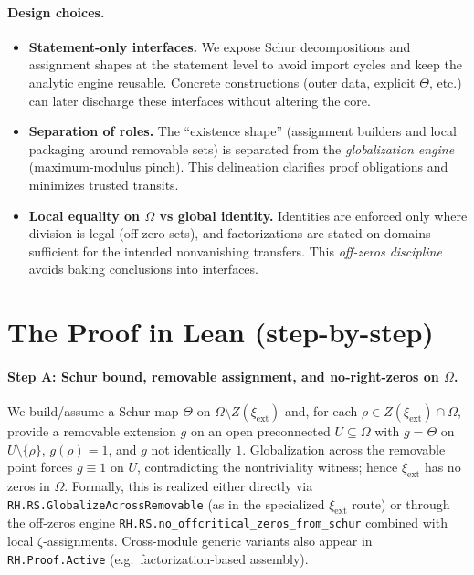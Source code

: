 \documentclass[11pt]{article}
\theoremstyle{plain}
\theoremstyle{definition}
\begin{document}
\paragraph{Design choices.}
\begin{itemize}
  \item \textbf{Statement-only interfaces.} We expose Schur decompositions and assignment shapes at the statement level to avoid import cycles and keep the analytic engine reusable. Concrete constructions (outer data, explicit \(\Theta\), etc.) can later discharge these interfaces without altering the core.
  \item \textbf{Separation of roles.} The ``existence shape'' (assignment builders and local packaging around removable sets) is separated from the \emph{globalization engine} (maximum-modulus pinch). This delineation clarifies proof obligations and minimizes trusted transits.
  \item \textbf{Local equality on \(\Omega\) vs global identity.} Identities are enforced only where division is legal (off zero sets), and factorizations are stated on domains sufficient for the intended nonvanishing transfers. This \emph{off-zeros discipline} avoids baking conclusions into interfaces.
\end{itemize}


\section{The Proof in Lean (step-by-step)}
\label{sec:steps}

\paragraph{Step A: Schur bound, removable assignment, and no-right-zeros on \(\Omega\).}
We build/assume a Schur map \(\Theta\) on \(\Omega\setminus Z(\xi_{\mathrm{ext}})\) and, for each \(\rho\in Z(\xi_{\mathrm{ext}})\cap\Omega\), provide a removable extension \(g\) on an open preconnected \(U\subseteq\Omega\) with
\(g=\Theta\) on \(U\setminus\{\rho\}\), \(g(\rho)=1\), and \(g\) not identically \(1\).
Globalization across the removable point forces \(g\equiv 1\) on \(U\), contradicting the nontriviality witness; hence \(\xi_{\mathrm{ext}}\) has no zeros in \(\Omega\).
Formally, this is realized either directly via \texttt{RH.RS.GlobalizeAcrossRemovable} (as in the specialized \(\xi_{\mathrm{ext}}\) route) or through the off-zeros engine
\texttt{RH.RS.no\_offcritical\_zeros\_from\_schur} combined with local \(\zeta\)-assignments.
Cross-module generic variants also appear in \texttt{RH.Proof.Active} (e.g.\ factorization-based assembly).
\end{document}
